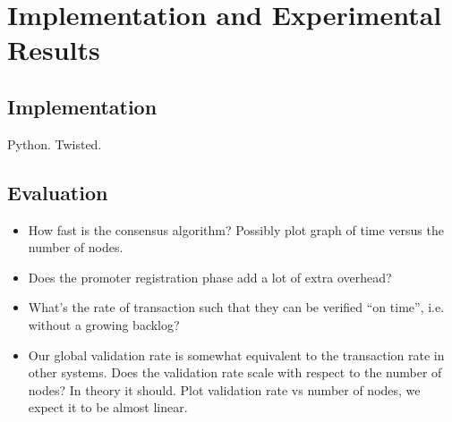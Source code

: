 \chapter{Implementation and Experimental Results}
\label{ch:implementation}

\section{Implementation}
Python. Twisted.

\section{Evaluation}
\begin{itemize}
  \item How fast is the consensus algorithm? Possibly plot graph of time versus
    the number of nodes.
  \item Does the promoter registration phase add a lot of extra overhead?
  \item What's the rate of transaction such that they can be verified ``on
    time'', i.e. without a growing backlog?
  \item Our global validation rate is somewhat equivalent to the transaction
    rate in other systems. Does the validation rate scale with respect to the
    number of nodes? In theory it should. Plot validation rate vs number of
    nodes, we expect it to be almost linear.
\end{itemize}